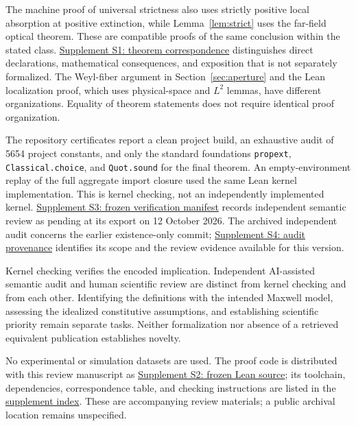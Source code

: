 \documentclass[11pt]{article}
\begin{document}
The machine proof of universal strictness also uses strictly positive local absorption at positive extinction, while Lemma~\ref{lem:strict} uses the far-field optical theorem. These are compatible proofs of the same conclusion within the stated class. \href{theorem-correspondence.html}{Supplement S1: theorem correspondence} distinguishes direct declarations, mathematical consequences, and exposition that is not separately formalized. The Weyl-fiber argument in Section~\ref{sec:aperture} and the Lean localization proof, which uses physical-space and $L^2$ lemmas, have different organizations. Equality of theorem statements does not require identical proof organization.

The repository certificates report a clean project build, an exhaustive audit of 5654 project constants, and only the standard foundations \texttt{propext}, \texttt{Classical.choice}, and \texttt{Quot.sound} for the final theorem. An empty-environment replay of the full aggregate import closure used the same Lean kernel implementation. This is kernel checking, not an independently implemented kernel. \href{reproducibility/manifest.json}{Supplement S3: frozen verification manifest} records independent semantic review as pending at its export on 12 October 2026. The archived independent audit concerns the earlier existence-only commit; \href{reproducibility/AUDIT_PROVENANCE.md}{Supplement S4: audit provenance} identifies its scope and the review evidence available for this version.

Kernel checking verifies the encoded implication. Independent AI-assisted semantic audit and human scientific review are distinct from kernel checking and from each other. Identifying the definitions with the intended Maxwell model, assessing the idealized constitutive assumptions, and establishing scientific priority remain separate tasks. Neither formalization nor absence of a retrieved equivalent publication establishes novelty.

No experimental or simulation datasets are used. The proof code is distributed with this review manuscript as \href{reproducibility/OQ7-complete-physical-theorem11-source.zip}{Supplement S2: frozen Lean source}; its toolchain, dependencies, correspondence table, and checking instructions are listed in the \href{reproducibility/SUPPLEMENT_INDEX.html}{supplement index}. These are accompanying review materials; a public archival location remains unspecified.
\end{document}
